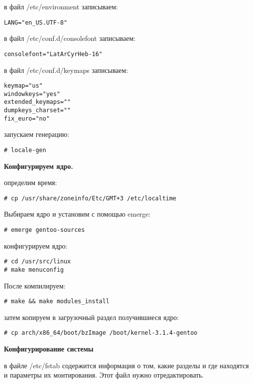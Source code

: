 \documentclass[12pt, a6paper]{article}
\begin{document}
в файл /etc/environment записываем:

\begin{verbatim}
LANG="en_US.UTF-8"
\end{verbatim}

в файл /etc/conf.d/consolefont записываем:

\begin{verbatim}
consolefont="LatArCyrHeb-16"
\end{verbatim}

в файл /etc/conf.d/keymaps записываем:
\begin{verbatim}
keymap="us"
windowkeys="yes"
extended_keymaps=""
dumpkeys_charset=""
fix_euro="no"
\end{verbatim}

запускаем генерацию:

\begin{verbatim}
# locale-gen
\end{verbatim}

{\bf Конфигурируем ядро.}

определим время:

\begin{verbatim}
# cp /usr/share/zoneinfo/Etc/GMT+3 /etc/localtime
\end{verbatim}

Выбираем ядро и установим с помощью emerge:

\begin{verbatim}
# emerge gentoo-sources
\end{verbatim}

конфигурируем ядро:

\begin{verbatim}
# cd /usr/src/linux
# make menuconfig
\end{verbatim}

После компилируем:

\begin{verbatim}
# make && make modules_install
\end{verbatim}

затем копируем в загрузочный раздел получившиеся ядро:

\begin{verbatim}
# cp arch/x86_64/boot/bzImage /boot/kernel-3.1.4-gentoo
\end{verbatim}

{\bf Конфигурирование системы}

в файле /etc/fstab  содержится информация о том, какие разделы и где находятся и параметры их монтирования. Этот файл нужно отредактировать.
\end{document}
